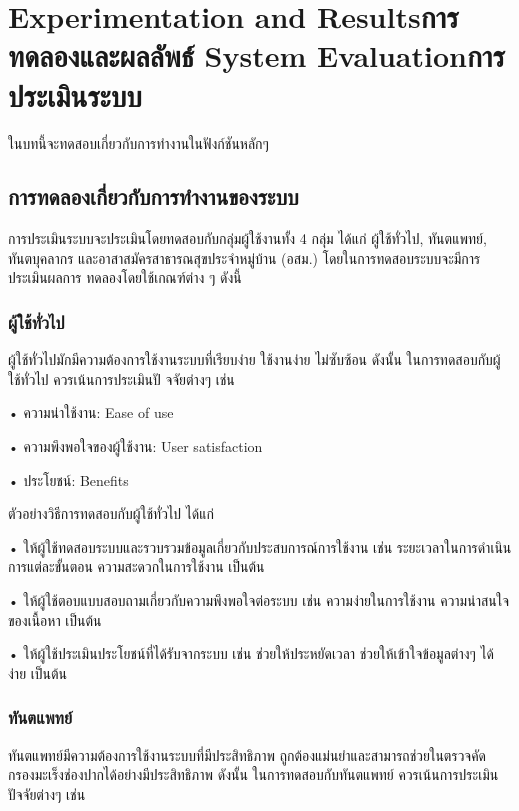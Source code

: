 \chapter{\ifproject%
\ifenglish Experimentation and Results\else การทดลองและผลลัพธ์\fi
\else%
\ifenglish System Evaluation\else การประเมินระบบ\fi
\fi}

ในบทนี้จะทดสอบเกี่ยวกับการทำงานในฟังก์ชันหลักๆ

\section{การทดลองเกี่ยวกับการทํางานของระบบ}

การประเมินระบบจะประเมินโดยทดสอบกับกลุ่มผู้ใช้งานทั้ง 4 กลุ่ม ได้แก่ ผู้ใช้ทั่วไป, ทันตแพทย์, ทันตบุคลากร และอาสาสมัครสาธารณสุขประจําหมู่บ้าน (อสม.) โดยในการทดสอบระบบจะมีการประเมินผลการ
ทดลองโดยใช้เกณฑ์ต่าง ๆ ดังนี้

\subsection{ผู้ใช้ทั่วไป}

ผู้ใช้ทั่วไปมักมีความต้องการใช้งานระบบที่เรียบง่าย ใช้งานง่าย ไม่ซับซ้อน ดังนั้น ในการทดสอบกับผู้ใช้ทั่วไป
ควรเน้นการประเมินปั จจัยต่างๆ เช่น

• ความน่าใช้งาน: Ease of use

• ความพึงพอใจของผู้ใช้งาน: User satisfaction


• ประโยชน์: Benefits

ตัวอย่างวิธีการทดสอบกับผู้ใช้ทั่วไป ได้แก่

• ให้ผู้ใช้ทดสอบระบบและรวบรวมข้อมูลเกี่ยวกับประสบการณ์การใช้งาน เช่น ระยะเวลาในการดําเนิน
การแต่ละขั้นตอน ความสะดวกในการใช้งาน เป็นต้น

• ให้ผู้ใช้ตอบแบบสอบถามเกี่ยวกับความพึงพอใจต่อระบบ เช่น ความง่ายในการใช้งาน ความน่าสนใจ
ของเนื้อหา เป็นต้น

• ให้ผู้ใช้ประเมินประโยชน์ที่ได้รับจากระบบ เช่น ช่วยให้ประหยัดเวลา ช่วยให้เข้าใจข้อมูลต่างๆ ได้ง่าย
เป็นต้น

\subsection{ทันตแพทย์}

ทันตแพทย์มีความต้องการใช้งานระบบที่มีประสิทธิภาพ ถูกต้องแม่นยําและสามารถช่วยในตรวจคัดกรองมะเร็งช่องปากได้อย่างมีประสิทธิภาพ ดังนั้น ในการทดสอบกับทันตแพทย์ ควรเน้นการประเมินปัจจัยต่างๆ เช่น

